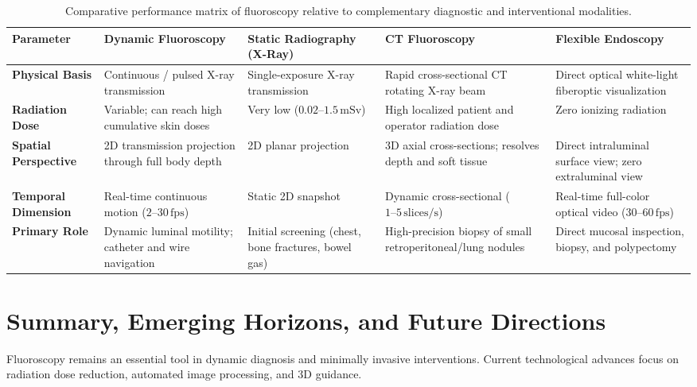 \documentclass[11pt,a4paper]{article}
\begin{document}
\begin{table}[htbp]
\centering
\small
\setlength{\tabcolsep}{3pt}
\begin{tabular}{p{2.6cm}p{2.8cm}p{2.9cm}p{2.8cm}p{2.9cm}}
\toprule
\textbf{Parameter} & \textbf{Dynamic Fluoroscopy} & \textbf{Static Radiography (X-Ray)} & \textbf{CT Fluoroscopy} & \textbf{Flexible Endoscopy} \\
\midrule
\textbf{Physical Basis} & Continuous / pulsed X-ray transmission & Single-exposure X-ray transmission & Rapid cross-sectional CT rotating X-ray beam & Direct optical white-light fiberoptic visualization \\
\addlinespace
\textbf{Radiation Dose} & Variable; can reach high cumulative skin doses & Very low ($0.02\text{--}1.5\,\text{mSv}$) & High localized patient and operator radiation dose & Zero ionizing radiation \\
\addlinespace
\textbf{Spatial Perspective} & 2D transmission projection through full body depth & 2D planar projection & 3D axial cross-sections; resolves depth and soft tissue & Direct intraluminal surface view; zero extraluminal view \\
\addlinespace
\textbf{Temporal Dimension} & Real-time continuous motion ($2\text{--}30\,\text{fps}$) & Static 2D snapshot & Dynamic cross-sectional ($1\text{--}5\,\text{slices/s}$) & Real-time full-color optical video ($30\text{--}60\,\text{fps}$) \\
\addlinespace
\textbf{Primary Role} & Dynamic luminal motility; catheter and wire navigation & Initial screening (chest, bone fractures, bowel gas) & High-precision biopsy of small retroperitoneal/lung nodules & Direct mucosal inspection, biopsy, and polypectomy \\
\bottomrule
\end{tabular}
\caption{Comparative performance matrix of fluoroscopy relative to complementary diagnostic and interventional modalities.}
\label{tab:modality_comparison}
\end{table}

\section{Summary, Emerging Horizons, and Future Directions}

Fluoroscopy remains an essential tool in dynamic diagnosis and minimally invasive interventions. Current technological advances focus on radiation dose reduction, automated image processing, and 3D guidance.
\end{document}
